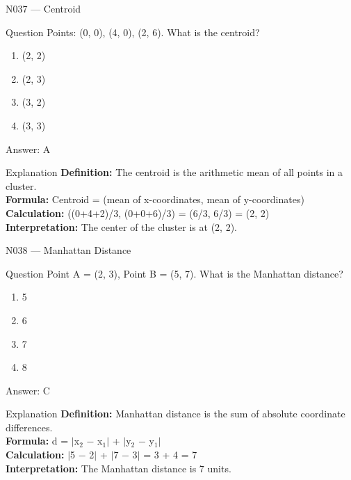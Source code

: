 \documentclass[aspectratio=169,8pt]{beamer}
\begin{document}
	\begin{frame}{N037 --- Centroid}
		\begin{block}{Question}
			Points: (0, 0), (4, 0), (2, 6). What is the centroid?
			\begin{enumerate}
				\item (2, 2)
				\item (2, 3)
				\item (3, 2)
				\item (3, 3)
			\end{enumerate}
		\end{block}
		\begin{exampleblock}{Answer: A}\end{exampleblock}
		\begin{block}{Explanation}
			\textbf{Definition:} The centroid is the arithmetic mean of all points in a cluster.\\
			\textbf{Formula:} Centroid = (mean of x-coordinates, mean of y-coordinates)\\
			\textbf{Calculation:} ((0+4+2)/3, (0+0+6)/3) = (6/3, 6/3) = (2, 2)\\
			\textbf{Interpretation:} The center of the cluster is at (2, 2).
		\end{block}
	\end{frame}
	
	\begin{frame}{N038 --- Manhattan Distance}
		\begin{block}{Question}
			Point A = (2, 3), Point B = (5, 7). What is the Manhattan distance?
			\begin{enumerate}
				\item 5
				\item 6
				\item 7
				\item 8
			\end{enumerate}
		\end{block}
		\begin{exampleblock}{Answer: C}\end{exampleblock}
		\begin{block}{Explanation}
			\textbf{Definition:} Manhattan distance is the sum of absolute coordinate differences.\\
			\textbf{Formula:} d = $|$x$_{2}$ $-$ x$_{1}$$|$ + $|$y$_{2}$ $-$ y$_{1}$$|$\\
			\textbf{Calculation:} $|$5 $-$ 2$|$ + $|$7 $-$ 3$|$ = 3 + 4 = 7\\
			\textbf{Interpretation:} The Manhattan distance is 7 units.
		\end{block}
	\end{frame}
	
\end{document}
